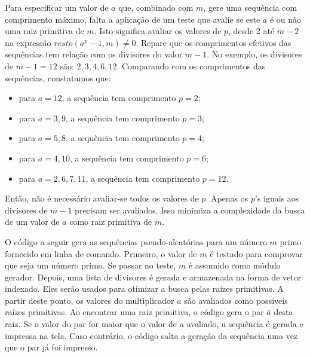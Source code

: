 \documentclass[a4paper,12pt,oneside,onecolumn]{uerj/uerj}
\begin{document}
Para especificar um valor de $a$ que, combinado com $m$, gere uma sequência com comprimento máximo, falta a aplicação de um teste que avalie se este $a$ é ou não uma raiz primitiva de $m$. Isto significa avaliar os valores de $p$, desde $2$ até $m-2$ na expressão $resto(a^{p}-1,m)\neq0$. Repare que os comprimentos efetivos das sequências tem relação com os divisores do valor $m-1$. No exemplo, os divisores de $m-1=12$ são: $2, 3, 4, 6, 12$. Comparando com os comprimentos das sequências, constatamos que:

\begin{itemize}
    \item para $a=12$, a sequência tem comprimento $p=2$;
    \item para $a=3,9$, a sequência tem comprimento $p=3$;
    \item para $a=5,8$, a sequência tem comprimento $p=4$;
    \item para $a=4,10$, a sequência tem comprimento $p=6$;
    \item para $a=2,6,7,11$, a sequência tem comprimento $p=12$.
\end{itemize}

\noindent Então, não é necessário avaliar-se todos os valores de $p$. Apenas os $p$'s iguais aos divisores de $m-1$ precisam ser avaliados. Isso minimiza a complexidade da busca de um valor de $a$ como raiz primitiva de $m$.

O código a seguir gera as sequências pseudo-aleatórias para um número $m$ primo fornecido em linha de comando. Primeiro, o valor de $m$ é testado para comprovar que seja um número primo. Se passar no teste, $m$ é assumido como módulo gerador. Depois, uma lista de divisores é gerada e armazenada na forma de vetor indexado. Eles serão usados para otimizar a busca pelas raízes primitivas. A partir deste ponto, os valores do multiplicador $a$ são avaliados como possíveis raízes primitivas. Ao encontrar uma raiz primitiva, o código gera o par $\bar a$ desta raiz. Se o valor do par for maior que o valor de $a$ avaliado, a sequência é gerada e impressa na tela. Caso contrário, o código salta a geração da sequência uma vez que o par já foi impresso.
\end{document}

